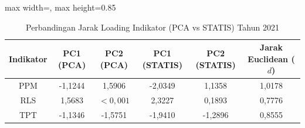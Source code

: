 \begin{table}[H]
\centering
\caption{Perbandingan Jarak Loading Indikator (PCA vs STATIS) Tahun 2021} \label{tab:sample1jarak_loading_2021}
\begin{adjustbox}{max width=\textwidth, max height=0.85\textheight}
\begin{tabular}{|c|c|c|c|c|c|}
\hline
\textbf{Indikator} & \textbf{PC1 (PCA)} & \textbf{PC2 (PCA)} & \textbf{PC1 (STATIS)} & \textbf{PC2 (STATIS)} & \textbf{Jarak Euclidean ($d$)} \\
\hline
PPM & -1,1244 & 1,5906 & -2,0349 & 1,1358 & 1,0178 \\
RLS & 1,5683 & $< 0,001$ & 2,3227 & 0,1893 & 0,7776 \\
TPT & -1,1346 & -1,5751 & -1,9410 & -1,2896 & 0,8555 \\
\hline
\end{tabular}
\end{adjustbox}
\end{table}